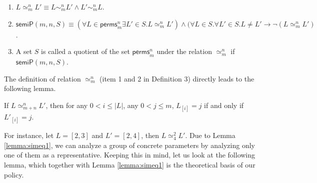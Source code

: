 \documentclass[conference]{IEEEtran}
\newcommand\lyj[1]{\textcolor{magenta}{#1}}
\newcommand\cai[1]{\textcolor{blue}{#1} }
\newcommand\caicomment[1]{\textcolor{blue}{comment: #1} }
\begin{document}
{\begin{definition}
\begin{enumerate}[leftmargin=14pt,noitemsep,nolistsep]
\item $L \simeq_m^n L' \equiv L \sim_m^n L' \wedge   L' \sim_m^n L$.


\item $\mathsf{semiP}(m,n,S)\equiv (\forall  L \in \mathsf{perms}_{m}^{n} \exists  L' \in S. L \simeq_m^n L' ) \wedge (\forall  L\in S. \forall L'\in S. L \neq L' \longrightarrow \neg  (L \simeq_m^n L' )$.

\item    A set $S$ is called a quotient of the set $\mathsf{perms}_{m}^{n}$ under the relation $\simeq_m^n$ if    $\mathsf{semiP}(m,n,S)$.
\end{enumerate}
\end{definition}
\vspace{-5pt}
The definition of  relation $\simeq_m^n$ (item 1 and 2 in Definition 3) directly leads to the following lemma. %



\vspace{-5pt}
\begin{lemma}\label{lemma:simeq1}%
If $L \simeq_{m+n}^n L' $, then for any $0<i\le |L|$, any $0<j \le m$, $L_{[i]}=j$ if and only if $L'_{[i]}=j$.
\end{lemma}
\vspace{-5pt}
For instance, let $L=[2,3]$ and $L'=[2,4]$, then $L \simeq_{4}^2 L' $. %
Due to Lemma \ref{lemma:simeq1},
we can analyze a group of concrete parameters by analyzing only one of them as a representative. Keeping this in mind, let us look at the following lemma, which together with Lemma \ref{lemma:simeq1} is the theoretical basis of our policy.

}
\end{document}
